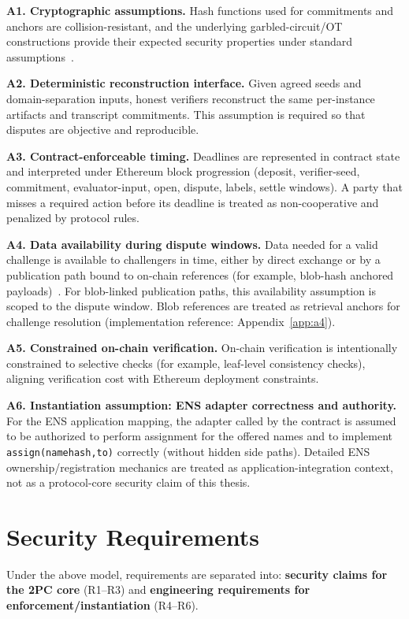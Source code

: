 \documentclass[final,twoside]{vutinfth}
\begin{document}
\textbf{A1. Cryptographic assumptions.}
Hash functions used for commitments and anchors are collision-resistant, and
the underlying garbled-circuit/OT constructions provide their expected security
properties under standard
assumptions~\cite{Bellare2012FoundationsGC,LindellPinkas2008}.

\textbf{A2. Deterministic reconstruction interface.}
Given agreed seeds and domain-separation inputs, honest verifiers reconstruct
the same per-instance artifacts and transcript commitments. This assumption is
required so that disputes are objective and reproducible.

\textbf{A3. Contract-enforceable timing.}
Deadlines are represented in contract state and interpreted under Ethereum block
progression (deposit, verifier-seed, commitment, evaluator-input, open,
dispute, labels, settle windows). A party that misses a required action before
its deadline is treated as non-cooperative and penalized by protocol rules.

\textbf{A4. Data availability during dispute windows.}
Data needed for a valid challenge is available to challengers in time, either
by direct exchange or by a publication path bound to on-chain references (for
example, blob-hash anchored payloads)~\cite{Buterin2022EIP4844}.
For blob-linked publication paths, this availability assumption is scoped to the
dispute window. Blob references are treated as retrieval anchors for challenge
resolution (implementation reference: Appendix~\ref{app:a4}).

\textbf{A5. Constrained on-chain verification.}
On-chain verification is intentionally constrained to selective checks (for
example, leaf-level consistency checks), aligning verification cost with
Ethereum deployment constraints.

\textbf{A6. Instantiation assumption: ENS adapter correctness and authority.}
For the ENS application mapping, the adapter called by the contract is assumed
to be authorized to perform assignment for the offered names and to implement
\texttt{assign(namehash,to)} correctly (without hidden side paths). Detailed ENS
ownership/registration mechanics are treated as application-integration context,
not as a protocol-core security claim of this thesis.

\section{Security Requirements}
Under the above model, requirements are separated into:
\textbf{security claims for the 2PC core} (R1--R3) and
\textbf{engineering requirements for enforcement/instantiation} (R4--R6).
\end{document}
